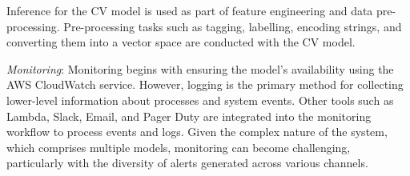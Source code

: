 Inference for the CV model is used as part of feature engineering and data pre-processing. Pre-processing tasks such as tagging, labelling, encoding strings, and converting them into a vector space are conducted with the CV model.

\textit{Monitoring}: Monitoring begins with ensuring the model's availability using the AWS CloudWatch service. However, logging is the primary method for collecting lower-level information about processes and system events. Other tools such as Lambda, Slack, Email, and Pager Duty are integrated into the monitoring workflow to process events and logs. Given the complex nature of the system, which comprises multiple models, monitoring can become challenging, particularly with the diversity of alerts generated across various channels.

\DIFdelbegin %
{%
}
\DIFdelend %
